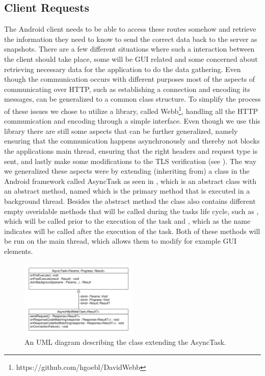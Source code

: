 \subsection{Client Requests}
\label{sub:client_requests}
The Android client needs to be able to access these routes somehow and retrieve the information they need to know to send the correct data back to the server as snapshots. There are a few different situations where such a interaction between the client should take place, some will be GUI related and some concerned about retrieving necessary data for the application to do the data gathering. Even though the communication occurs with different purposes most of the aspects of communicating over HTTP, such as establishing a connection and encoding its messages, can be generalized to a common class structure. To simplify the process of these issues we chose to utilize a library, called Webb\footnote{https://github.com/hgoebl/DavidWebb}, handling all the HTTP communication and encoding through a simple interface. Even though we use this library there are still some aspects that can be further generalized, namely ensuring that the communication happens asynchronously and thereby not blocks the applications main thread, ensuring that the right headers and request type is sent, and lastly make some modifications to the TLS verification (see ). The way we generalized these aspects were by extending (inheriting from) a class in the Android framework called AsyncTask as seen in , which is an abstract class with an abstract method, named  which is the primary method that is executed in a background thread. Besides the abstract method the class also contains different empty overidable methods that will be called during the tasks life cycle, such as , which will be called prior to the execution of the task and , which as the name indicates will be called after the execution of the task. Both of these methods will be run on the main thread, which allows them to modify for example GUI elements. 

\begin{figure}[!htbp]
    \centering
    \includegraphics[width=0.5\textwidth]{graphic/architecture/async_http_webb_task.pdf}
    \caption{An UML diagram describing the class extending the AsyncTask.}
    \label{fig:async_http_webb_task}
\end{figure}
\FloatBarrier

